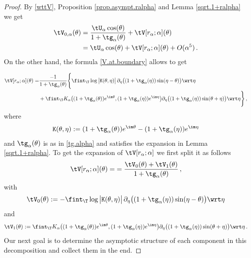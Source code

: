 \documentclass[a4paper,reqno,10pt]{article}
\newcommand{\pa}{\partial}
\begin{document}
\begin{proof}
    By \eqref{wttV}, Proposition \ref{prop.asympt.ralpha} and Lemma \ref{sqrt.1+ralpha} we get
    \begin{align}
	\tV_{0,\alpha}(\theta)&= \frac{\tU_{\alpha} \cos(\theta)}{1+\tg_{\alpha}(\theta)} + \tV[r_\alpha;\alpha](\theta)\\
    &=\tU_{\alpha} \cos(\theta)+\tV[r_\alpha;\alpha](\theta)+O(\alpha^5)\,.\label{form-V-0al}
    \end{align}
On the other hand, the formula  \eqref{V.at.boundary} allows to get

		\begin{align}
			\tV[r_\alpha;\alpha](\theta)=& \frac{-1}{1+\tg_{\alpha}(\theta)} \Bigg\{   \fint_{\T} \log\big|\mathtt{K}(\theta,\eta)  \big|\, \pa_{\eta} \big( (1+\tg_{\alpha}(\eta)) \sin(\eta-\theta) \big) \wrt\eta \\
			 &+ \fint_{\T} K_\alpha\big((1+\tg_{\alpha}(\theta)) e^{\im\theta}, (1+\tg_{\alpha}(\eta))e^{\im\eta} \big) \pa_{\eta} \big( (1+\tg_{\alpha}(\eta)) \sin(\theta+\eta) \big) \wrt \eta \Bigg\}\,,
		\end{align}
	where 
    $$
    \mathtt{K}(\theta,\eta):=(1+\tg_{\alpha}(\theta))  e^{\im\theta}- (1+\tg_{\alpha}(\eta))e^{\im\eta}
    $$
    and $\tg_{\alpha}(\theta)$ is as in \eqref{tg.alpha} and satisfies the expansion in Lemma \ref{sqrt.1+ralpha}. To get the expansion of $\tV[r_\alpha;\alpha]$ we first split it as follows
   \begin{align}\label{V-ralpha}
    \tV[r_\alpha;\alpha](\theta) = {=\frac{\tV_0(\theta)+\tV_{1}(\theta)}{1+\tg_{\alpha}(\theta)} } \,,
    \end{align}
with
\begin{align}\label{V-0-form}
\tV_0(\theta):=-\fint_{\T} \log\big|\mathtt{K}(\theta,\eta)  \big|\, \pa_{\eta} \big( (1+\tg_{\alpha}(\eta)) \sin(\eta-\theta) \big) \wrt\eta
\end{align}
and
\begin{align}\label{V-1-form}
\tV_1(\theta):=\fint_{\T} K_\alpha\big((1+\tg_{\alpha}(\theta)) e^{\im\theta}, (1+\tg_{\alpha}(\eta))e^{\im\eta} \big) \pa_{\eta} \big( (1+\tg_{\alpha}(\eta)) \sin(\theta+\eta) \big) \wrt \eta\,.
\end{align}
Our next goal is to determine the asymptotic structure of each component in this decomposition and collect them in the end.

\end{proof}
\end{document}
